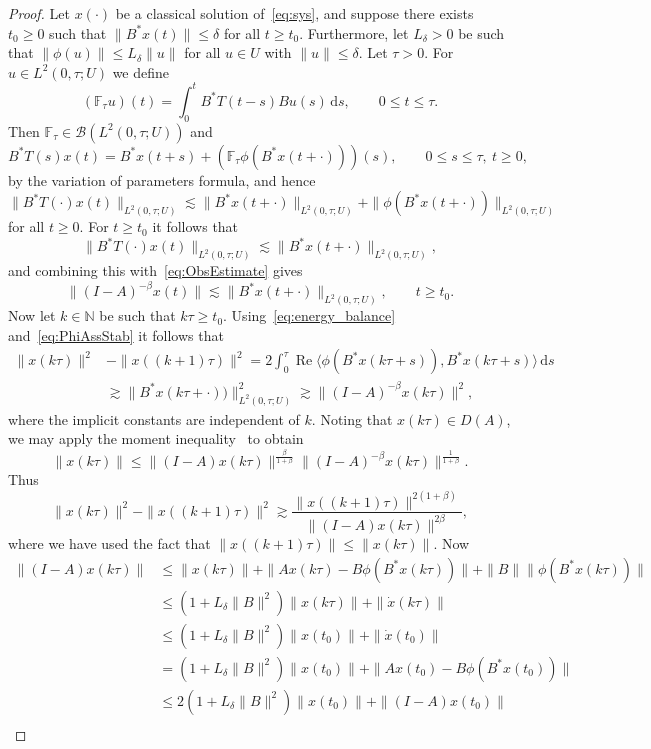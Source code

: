 \documentclass[10pt,a4paper]{amsart}
\newcommand{\B}{\mathcal{B}}
\newcommand{\NN}{\mathbb{N}}
\DeclareMathOperator*{\R}{Re}
\newcommand{\dd}{\mathrm{d}}
\begin{document}
\begin{proof}
Let $x(\cdot)$ be a classical solution of~\eqref{eq:sys}, and suppose there exists $t_0\ge0$ such that $\|B^*x(t)\|\le\delta$ for all $t\ge t_0$. Furthermore, let $L_\delta>0$ be such that $\|\phi(u)\|\le L_\delta\|u\|$ for all $u\in U$ with $\|u\|\le\delta$. Let $\tau>0$. For $u\in L^2(0,\tau;U)$ we define 
 $$(\mathbb{F}_\tau u)(t)=\int_0^t B^\ast T(t-s)Bu(s)\,\dd s,\qquad 0\le t\le\tau.$$
Then $\mathbb{F}_\tau\in \B(L^2(0,\tau;U))$ and 
$$B^\ast T(s)x(t) = B^\ast x(t+s)+ (\mathbb{F}_\tau\phi(B^\ast x(t+\cdot)))(s),\qquad 0\le s\le\tau,\ t\ge0,$$
by the variation of parameters formula, and hence
$$
\|B^\ast T(\cdot)x(t)\|_{L^2(0,\tau;U)}\lesssim\|B^\ast x(t+\cdot)\|_{L^2(0,\tau;U)}+\|\phi(B^\ast x(t+\cdot))\|_{L^2(0,\tau;U)}
$$
for all $t\ge0$. For $t\ge t_0$ it follows that 
$$\|B^\ast T(\cdot)x(t)\|_{L^2(0,\tau;U)}\lesssim\|B^\ast x(t+\cdot)\|_{L^2(0,\tau;U)},$$
 and combining this with~\eqref{eq:ObsEstimate} gives
$$\|(I-A)^{-\beta} x(t)\|
\lesssim  \|B^\ast x(t+\cdot)\|_{L^2(0,\tau;U)}, \qquad t\ge t_0.$$
Now let $k\in\NN$ be such that $k\tau\ge t_0$. Using~\eqref{eq:energy_balance} and~\eqref{eq:PhiAssStab} it follows that
$$\begin{aligned}
\|x(k\tau)\|^2&-\|x((k+1)\tau)\|^2= 2\int_0^\tau \R \langle \phi(B^\ast x(k\tau+s)),B^\ast x(k\tau+s)\rangle\, \dd s\\
&\gtrsim \|B^\ast x(k\tau+\cdot))\|_{L^2(0,\tau;U)}^2\gtrsim\|(I-A)^{-\beta}x(k\tau) \|^2,
\end{aligned}
$$
where the implicit constants are independent of $k$. Noting that $x(k\tau)\in D(A)$, we may apply the moment inequality~\cite[Thm.~II.5.34]{EngNag00book} to obtain
$$\|x(k\tau)\|\le \|(I-A)x(k\tau)\|^{\frac{\beta}{1+\beta}}\|(I-A)^{-\beta}x(k\tau)\|^{\frac{1}{1+\beta}}.$$
Thus
$$
\|x(k\tau)\|^2-\|x((k+1)\tau)\|^2\gtrsim\frac{\|x((k+1)\tau)\|^{2(1+\beta)}}{\|(I-A)x(k\tau)\|^{2\beta}},
$$
where we have used the fact that $\|x((k+1)\tau)\|\le\|x(k\tau)\|$. Now
$$\begin{aligned}
\|(I-A)x(k\tau)\|&\le \|x(k\tau)\|+\|Ax(k\tau)-B\phi(B^* x(k\tau))\|+\|B\|\|\phi(B^*x(k\tau))\|\\
&\le (1+L_\delta\|B\|^2)\|x(k\tau)\|+\|\dot{x}(k\tau)\|\\
&\le (1+L_\delta\|B\|^2)\|x(t_0)\|+\|\dot{x}(t_0)\|\\
&=(1+L_\delta\|B\|^2)\|x(t_0)\|+\|Ax(t_0)-B\phi(B^*x(t_0))\|\\
&\le 2(1+L_\delta\|B\|^2)\|x(t_0)\|+\|(I-A)x(t_0)\|\\

\end{aligned}$$
\end{proof}
\end{document}

